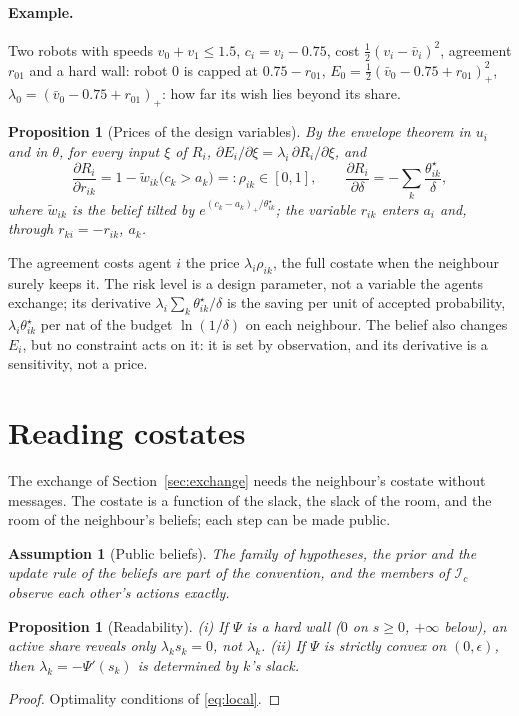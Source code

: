 \documentclass[11pt]{article}
\newtheorem{proposition}[theorem]{Proposition}
\newtheorem{assumption}[theorem]{Assumption}
\theoremstyle{definition}
\theoremstyle{remark}
\newcommand{\I}{\mathcal{I}}
\begin{document}
\paragraph{Example.} Two robots with speeds $v_0+v_1\le1.5$, $c_i=v_i-0.75$, cost $\frac12(v_i-\bar v_i)^2$, agreement $r_{01}$ and a hard wall: robot $0$ is capped at $0.75-r_{01}$, $E_0=\frac12(\bar v_0-0.75+r_{01})_+^2$, $\lambda_0=(\bar v_0-0.75+r_{01})_+$: how far its wish lies beyond its share.

\begin{proposition}[Prices of the design variables]\label{prop:prices}
By the envelope theorem in $u_i$ and in $\theta$, for every input $\xi$ of $R_i$, $\partial E_i/\partial\xi=\lambda_i\,\partial R_i/\partial\xi$, and
\[
\frac{\partial R_i}{\partial r_{ik}}=1-\tilde w_{ik}\big(c_k>a_k\big)=:\rho_{ik}\in[0,1],\qquad
\frac{\partial R_i}{\partial\delta}=-\sum_k\frac{\theta^\star_{ik}}{\delta},
\]
where $\tilde w_{ik}$ is the belief tilted by $e^{(c_k-a_k)_+/\theta^\star_{ik}}$; the variable $r_{ik}$ enters $a_i$ and, through $r_{ki}=-r_{ik}$, $a_k$.
\end{proposition}

The agreement costs agent $i$ the price $\lambda_i\rho_{ik}$, the full costate when the neighbour surely keeps it. The risk level is a design parameter, not a variable the agents exchange; its derivative $\lambda_i\sum_k\theta^\star_{ik}/\delta$ is the saving per unit of accepted probability, $\lambda_i\theta^\star_{ik}$ per nat of the budget $\ln(1/\delta)$ on each neighbour. The belief also changes $E_i$, but no constraint acts on it: it is set by observation, and its derivative is a sensitivity, not a price.

\section{Reading costates}
The exchange of Section~\ref{sec:exchange} needs the neighbour's costate without messages. The costate is a function of the slack, the slack of the room, and the room of the neighbour's beliefs; each step can be made public.

\begin{assumption}[Public beliefs]\label{ass:public}
The family of hypotheses, the prior and the update rule of the beliefs are part of the convention, and the members of $\I_c$ observe each other's actions exactly.
\end{assumption}

\begin{proposition}[Readability]\label{prop:read}
(i) If $\Psi$ is a hard wall ($0$ on $s\ge0$, $+\infty$ below), an active share reveals only $\lambda_ks_k=0$, not $\lambda_k$. (ii) If $\Psi$ is strictly convex on $(0,\epsilon)$, then $\lambda_k=-\Psi'(s_k)$ is determined by $k$'s slack.
\end{proposition}
\begin{proof}
Optimality conditions of \eqref{eq:local}.
\end{proof}
\end{document}
